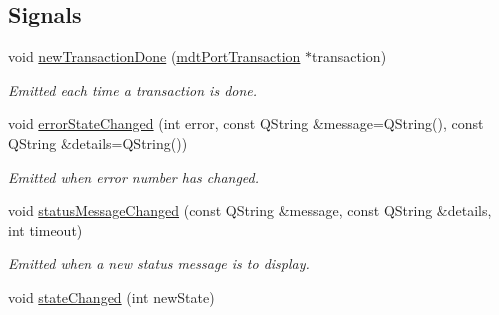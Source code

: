 \subsection*{Signals}
\begin{DoxyCompactItemize}
\item 
void \hyperlink{classmdt_port_manager_a416a24db1048e9f66aef27ea810954d2}{newTransactionDone} (\hyperlink{classmdt_port_transaction}{mdtPortTransaction} $\ast$transaction)
\begin{DoxyCompactList}\small\item\em Emitted each time a transaction is done. \end{DoxyCompactList}\item 
void \hyperlink{classmdt_port_manager_a7f9437d084e136d8d265dace7431395f}{errorStateChanged} (int error, const QString \&message=QString(), const QString \&details=QString())
\begin{DoxyCompactList}\small\item\em Emitted when error number has changed. \end{DoxyCompactList}\item 
void \hyperlink{classmdt_port_manager_a6f6c6f8a8430d8631a08c765565db9ab}{statusMessageChanged} (const QString \&message, const QString \&details, int timeout)
\begin{DoxyCompactList}\small\item\em Emitted when a new status message is to display. \end{DoxyCompactList}\item 
\hypertarget{classmdt_port_manager_a1c9e1848373831962b7ec83fd4fe5d35}{
void \hyperlink{classmdt_port_manager_a1c9e1848373831962b7ec83fd4fe5d35}{stateChanged} (int newState)}
\label{classmdt_port_manager_a1c9e1848373831962b7ec83fd4fe5d35}


\end{DoxyCompactItemize}
